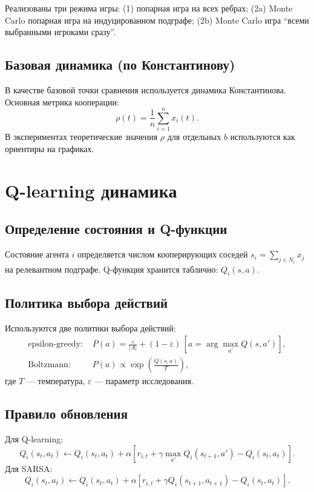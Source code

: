 \documentclass[a4paper, fontsize=14pt]{article}
\begin{document}
Реализованы три режима игры:
(1) попарная игра на всех ребрах;
(2a) Monte Carlo попарная игра на индуцированном подграфе;
(2b) Monte Carlo игра ``всеми выбранными игроками сразу''.

\subsection{Базовая динамика (по Константинову)}
В качестве базовой точки сравнения используется динамика Константинова.
Основная метрика кооперации:
\begin{equation}
\rho(t) = \frac{1}{n} \sum_{i=1}^n x_i(t).
\end{equation}
В экспериментах теоретические значения $\rho$ для отдельных $b$
используются как ориентиры на графиках.

\section{Q-learning динамика}
\subsection{Определение состояния и Q-функции}
Состояние агента $i$ определяется числом кооперирующих соседей
$s_i = \sum_{j \in N_i} x_j$ на релевантном подграфе.
Q-функция хранится таблично: $Q_i(s,a)$.

\subsection{Политика выбора действий}
Используются две политики выбора действий:
\begin{align}
\text{epsilon-greedy: } & P(a) = \frac{\varepsilon}{|A|} + (1-\varepsilon)\,[a=\arg\max_{a'} Q(s,a')], \\
\text{Boltzmann: } & P(a) \propto \exp\left(\frac{Q(s,a)}{T}\right),
\end{align}
где $T$ --- температура, $\varepsilon$ --- параметр исследования.

\subsection{Правило обновления}
Для Q-learning:
\begin{equation}
Q_i(s_t,a_t) \leftarrow Q_i(s_t,a_t) + \alpha\left[r_{i,t} + \gamma \max_{a'} Q_i(s_{t+1},a') - Q_i(s_t,a_t)\right].
\end{equation}
Для SARSA:
\begin{equation}
Q_i(s_t,a_t) \leftarrow Q_i(s_t,a_t) + \alpha\left[r_{i,t} + \gamma Q_i(s_{t+1},a_{t+1}) - Q_i(s_t,a_t)\right].
\end{equation}
\end{document}
